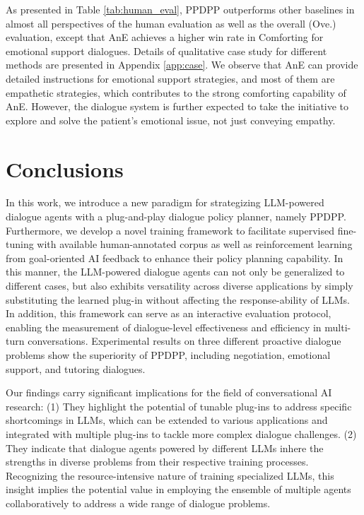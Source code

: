 \documentclass{article} %
\begin{document}
As presented in Table \ref{tab:human_eval}, PPDPP outperforms other baselines in almost all perspectives of the human evaluation as well as the overall (Ove.) evaluation, except that AnE achieves a higher win rate in Comforting for emotional support dialogues.  
Details of qualitative case study for different methods are presented in Appendix \ref{app:case}. 
We observe that AnE can provide detailed instructions for emotional support strategies, and most of them are empathetic strategies, which contributes to the strong comforting capability of AnE. However, the dialogue system is further expected to take the initiative to explore and solve the patient's emotional issue, not just conveying empathy. 


\section{Conclusions}
In this work, we introduce a new paradigm for strategizing LLM-powered dialogue agents with a plug-and-play dialogue policy planner, namely PPDPP. 
Furthermore, we develop a novel training framework to facilitate supervised fine-tuning with available human-annotated corpus as well as reinforcement learning from goal-oriented AI feedback to enhance their policy planning capability.  
In this manner, the LLM-powered dialogue agents can not only be generalized to different cases, but also exhibits versatility across diverse applications by simply substituting the learned plug-in without affecting the response-ability of LLMs. 
In addition, this framework can serve as an interactive evaluation protocol, enabling the measurement of dialogue-level effectiveness and efficiency in multi-turn conversations. 
Experimental results on three different proactive dialogue problems show the superiority of PPDPP, including negotiation, emotional support, and tutoring dialogues. 

Our findings carry significant implications for the field of conversational AI research: (1) They highlight the potential of tunable plug-ins to address specific shortcomings in LLMs, which can be extended to various applications and integrated with multiple plug-ins to tackle more complex dialogue challenges. (2) They indicate that dialogue agents powered by different LLMs inhere the strengths in diverse problems from their respective training processes. Recognizing the resource-intensive nature of training specialized LLMs, this insight implies the potential value in employing the ensemble of multiple  agents collaboratively to address a wide range of dialogue problems. 
\end{document}
